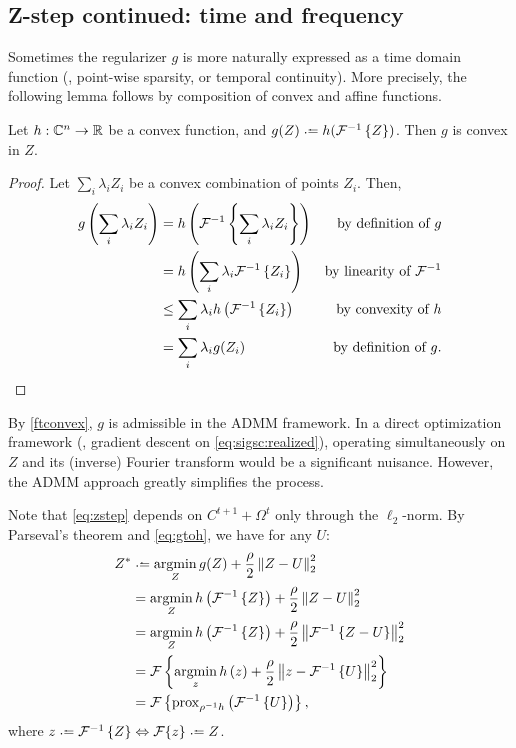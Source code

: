 \documentclass{article}
\renewcommand{\C}{\ensuremath{\mathbb{C}}}
\begin{document}
\subsection{Z-step continued: time and frequency}

Sometimes the regularizer $g$ is more naturally expressed as a time domain function (\eg, point-wise sparsity, or temporal continuity).  
More precisely, the following lemma follows by composition of convex and affine functions.
\begin{lemma}
Let $h : \C^n \rightarrow \R$ be a convex function, and $g(Z) \defeq h(\FT^{-1}\left\{Z\right\})$.  Then $g$ is convex in $Z$.
\label{ftconvex}
\end{lemma}
\begin{proof}
Let $\sum_i \lambda_i Z_i$ be a convex combination of points $Z_i$.  Then,
\begin{align*}
g\left(\sum_i \lambda_i Z_i \right) &= h\left(\mathcal{F}^{-1}\left\{\sum_i \lambda_i Z_i \right\} \right) & \text{by definition of } g\\
&= h\left( \sum_i \lambda_i \mathcal{F}^{-1}\left\{ Z_i\right\}\right) & \text{by linearity of } \mathcal{F}^{-1}\\
&\leq \sum_i \lambda_i h\left(\mathcal{F}^{-1}\left\{Z_i\right\} \right) & \text{by convexity of } h\\
&= \sum_i \lambda_i g(Z_i) & \text{by definition of } g.
\end{align*}
\end{proof}
By \autoref{ftconvex}, $g$ is admissible in the ADMM framework.
In a direct optimization framework (\eg, gradient descent on \autoref{eq:sigsc:realized}), operating
simultaneously on $Z$ and its (inverse) Fourier transform would be a significant nuisance.  However, the ADMM approach
greatly simplifies the process.

Note that \autoref{eq:zstep} depends on $C^{t+1} + \Omega^{t}$ only through the $\ell_2$-norm.
By Parseval's theorem and \autoref{eq:gtoh}, we have for any $U$:
\begin{align*}
Z^* 
&\defeq \argmin_Z g(Z) + \frac{\rho}{2} \left\|Z - U \right\|_2^2 \\
&= \argmin_Z h\left(\FT^{-1}\left\{Z\right\}\right) + \frac{\rho}{2} \left\|Z - U \right\|_2^2\\
&= \argmin_Z h\left(\FT^{-1}\left\{Z\right\}\right) + \frac{\rho}{2} \left\|\FT^{-1}\left\{Z - U\right\} \right\|_2^2\\
&= \FT\left\{\argmin_z h\left(z\right) + \frac{\rho}{2} \left\|z - \FT^{-1}\left\{U\right\}
\right\|_2^2\right\}\\
&= \FT\left\{\prox_{\rho^{-1} h} \left( \FT^{-1}\left\{U\right\}\right)\right\},
\end{align*}
where $z \defeq \FT^{-1}\left\{Z\right\} \Leftrightarrow \FT\{z\} \defeq Z$.
\end{document}
